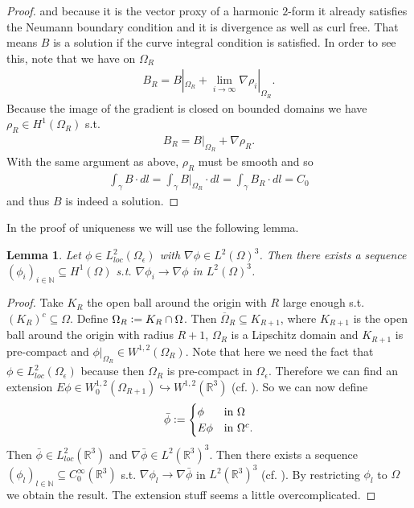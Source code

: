 \documentclass[12pt,a4paper]{article}
\numberwithin{equation}{subsection}
\newtheorem{lemma}{Lemma}[section]
\numberwithin{lemma}{subsection}
\theoremstyle{definition}
\newcommand{\naturalnum}{\mathbb{N}}
\newcommand{\real}{\mathbb{R}}
\begin{document}
\begin{proof}
    and because it is the vector 
    proxy of a harmonic $2$-form it already satisfies 
    the Neumann boundary condition and it is divergence as well as curl free.
    That means $B$ is a solution if the curve integral condition is satisfied.
    In order to see this, note that we have on $\Omega_R$
    \begin{align*}
        B_R = B|_{\Omega_R} +\lim\limits_{i\rightarrow \infty}\nabla \rho_i|_{\Omega_R}.
    \end{align*}
    Because the image of the gradient is closed on bounded domains 
    we have $\rho_R \in H^1(\Omega_R)$ s.t.
    \begin{align*}
        B_R = B|_{\Omega_R} + \nabla \rho_R.
    \end{align*}
    With the same argument as above, $\rho_R$ must be smooth and so
    \begin{align*}
        \int_\gamma B \cdot dl =  \int_\gamma B|_{\Omega_R} \cdot dl 
        =  \int_\gamma B_R \cdot dl = C_0
    \end{align*}
    and thus $B$ is indeed a solution.
\end{proof}

In the proof of uniqueness we will use the following lemma. 
\begin{lemma}\label{lem:gradient_sequence}
    Let $\phi \in L^2_{loc}(\Omega_\epsilon)$ 
    with $\nabla \phi \in L^2(\Omega)^3$. Then 
    there exists a sequence $(\phi_i)_{i \in \naturalnum} \subseteq H^1(\Omega)$
    s.t. $\nabla \phi_i \rightarrow \nabla \phi$ in $L^2(\Omega)^3$.
\end{lemma}
\begin{proof}
    Take $K_R$ the open ball around the origin with $R$ large enough 
    s.t. $(K_R)^c \subseteq \Omega$. 
    Define $\Omega_R \vcentcolon= K_R \cap \Omega$. Then 
    $\overline{\Omega}_R \subseteq K_{R+1}$, where $K_{R+1}$ is the open ball 
    around the origin with radius $R+1$, $\Omega_R$ is a Lipschitz 
    domain and $K_{R+1}$ is pre-compact and
    $\phi|_{\Omega_R} \in W^{1,2}(\Omega_R)$. 
    Note that here we need the fact that $\phi \in L^2_{loc}(\Omega_\epsilon)$
    because then $\Omega_R$ is pre-compact in $\Omega_\epsilon$. 
    Therefore we can find an extension
    $E\phi \in W_0^{1,2}(\Omega_{R+1}) \hookrightarrow W^{1,2}(\mathbb{R}^3)$
    (cf. \cite[Sec.\,1.5.1]{mazya}). So we can now define
    \begin{align*}
    \bar{\phi} \vcentcolon=
    \begin{cases}
        \phi & \mbox{in $\Omega$}\\
        E\phi & \mbox{in $\Omega^c$.}\\
    \end{cases}
    \end{align*}
    Then $\bar{\phi} \in L^2_{loc}(\real^3)$ and 
    $\nabla \bar{\phi} \in L^2(\real^3)^3$. 
    Then there exists a sequence 
    $(\phi_l) _{l \in \naturalnum} \subseteq C^\infty_0(\real^3)$ s.t.
    $\nabla \phi_l \rightarrow \nabla \bar{\phi}$ in $L^2(\real^3)^3$ 
    (cf. \cite[Lemma 1.1]{simader}). By restricting $\phi_l$ to $\Omega$ 
    we obtain the result. {\color{red} The extension stuff seems a little overcomplicated.}
\end{proof}
\end{document}
